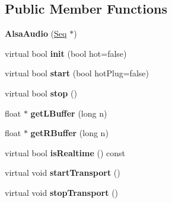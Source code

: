 \subsection*{Public Member Functions}
\begin{DoxyCompactItemize}
\item 
\mbox{\label{class_ms_1_1_alsa_audio_a5c94fb64cd770a883459f372ddbb6382}} 
{\bfseries Alsa\+Audio} (\hyperlink{class_ms_1_1_seq}{Seq} $\ast$)
\item 
\mbox{\label{class_ms_1_1_alsa_audio_abf1a18a88b234bfedcdd59c16e974bff}} 
virtual bool {\bfseries init} (bool hot=false)
\item 
\mbox{\label{class_ms_1_1_alsa_audio_a9b03aa605fe8ddcd9b8663e66a0b8d2f}} 
virtual bool {\bfseries start} (bool hot\+Plug=false)
\item 
\mbox{\label{class_ms_1_1_alsa_audio_a2fc349621f52d2dec9d39dab03e01a60}} 
virtual bool {\bfseries stop} ()
\item 
\mbox{\label{class_ms_1_1_alsa_audio_a22d588dbeb937edb006efc40fef3cb2a}} 
float $\ast$ {\bfseries get\+L\+Buffer} (long n)
\item 
\mbox{\label{class_ms_1_1_alsa_audio_a5e7950e132efc47f967f8da4e86b676e}} 
float $\ast$ {\bfseries get\+R\+Buffer} (long n)
\item 
\mbox{\label{class_ms_1_1_alsa_audio_ad0cad692c5fb8efbd1e02d553dcf8c98}} 
virtual bool {\bfseries is\+Realtime} () const
\item 
\mbox{\label{class_ms_1_1_alsa_audio_aea0549eedf1457f1dc1f51c4d84aa763}} 
virtual void {\bfseries start\+Transport} ()
\item 
\mbox{\label{class_ms_1_1_alsa_audio_a0078d780e88568b4ade7561965adb931}} 
virtual void {\bfseries stop\+Transport} ()
\item 
\mbox{\label{class_ms_1_1_alsa_audio_a2fd4e3824f472be255c595b89c6cea63}} 

\end{DoxyCompactItemize}

